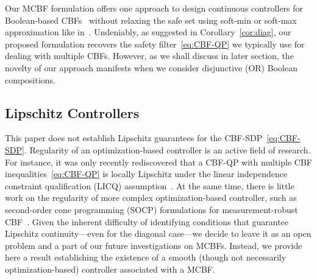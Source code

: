 \documentclass[10pt,twocolumn,twoside]{IEEEtran}
\theoremstyle{definition}
\begin{document}
Our MCBF formulation offers one approach to design continuous controllers for Boolean-based CBFs~\cite{PG-JC-ME:17} without relaxing the safe set using soft-min or soft-max approximation like in~\cite{TGM-ADA:23}. Undeniably, as suggested in Corollary~\ref{cor:diag}, our proposed formulation recovers the safety filter~\eqref{eq:CBF-QP} we typically use for dealing with multiple CBFs. However, as we shall discuss in later section, the novelty of our approach manifests when we consider disjunctive (OR) Boolean compositions.

\subsection{Lipschitz Controllers}
This paper does not establish Lipschitz guarantees for the CBF-SDP~\eqref{eq:CBF-SDP}. Regularity of an optimization-based controller is an active field of research. For instance, it was only recently rediscovered that a CBF-QP with multiple CBF inequalities~\eqref{eq:CBF-QP} is locally Lipschitz under the linear independence constraint qualification (LICQ) assumption~\cite{PM-AA-JC:25}. At the same time, there is little work on the regularity of more complex optimization-based controller, such as second-order cone programming (SOCP) formulations for measurement-robust CBF~\cite{RKC-AWS-AJT-TGM-KLB-ADA:21}. Given the inherent difficulty of identifying conditions that guarantee Lipschitz continuity---even for the diagonal case---we decide to leave it as an open problem and a part of our future investigations on MCBFs. Instead, we provide here a result establishing the existence of a smooth (though not necessarily optimization-based) controller associated with a MCBF.
\end{document}
